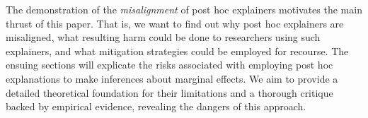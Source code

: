 \documentclass[mnsc,blindrev]{informs3}
\begin{document}
The demonstration of the \textit{misalignment} %
of post hoc explainers  motivates the main thrust of this paper. That is, we want to find out why post hoc explainers are misaligned, what resulting harm could be done to researchers using such explainers, and what mitigation strategies could be employed for recourse. 
The ensuing sections will explicate the risks associated with employing post hoc explanations to make inferences about marginal effects. We aim to provide a detailed theoretical foundation for their limitations and a thorough critique backed by empirical evidence, revealing the dangers of this approach.
\end{document}
